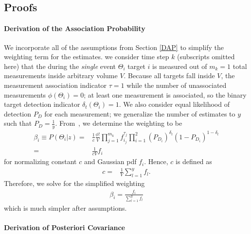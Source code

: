 \documentclass[letterpaper, 10pt, conference]{ieeeconf}
\begin{document}
\begin{appendix}
\label{append}

\subsection{Proofs}

\paragraph{Derivation of the Association Probability}

We incorporate all of the assumptions from Section \ref{DAP} to simplify the weighting term for the estimates.
 we consider time step $k$ (subscripts omitted here) that the during the \emph{single} event $\Theta_i$ target $i$ is measured out of $m_k=1$ total measurements inside arbitrary volume $V$.
Because all targets fall inside $V$, the measurement association indicator $\tau=1$ while the number of unassociated measurements $\phi(\Theta_i)=0$; at least one measurement is associated, so the binary target detection indicator $\delta_t(\Theta_i)=1$.
We also consider equal likelihood of detection $P_D$ for each measurement; we generalize the number of estimates to $y$ such that $P_D=\frac{1}{y}$.
From~\cite[Section ?.?]{TrackDataAssoc}, we determine the weighting to be
\begin{align}
\beta_i\equiv P(\Theta_i|z)=&\frac{1}{c}\frac{\phi!}{V}\displaystyle\prod_{j=1}^{m_k} f_{i_j}^{\tau_j}\displaystyle\prod_{i=1}^{2} (P_{D_i})^{\delta_t}(1-P_{D_i})^{1-\delta_t}\\
=&\frac{1}{cV}f_{i}
\end{align}
for normalizing constant $c$ and Gaussian pdf $f_{i}$. Hence, $c$ is defined as
\begin{align}
c=&\frac{1}{V}\displaystyle\sum\limits_{l=1}^y f_{l}.
\end{align}
Therefore, we solve for the simplified weighting
\begin{align}
\beta_i=\frac{f_i}{\displaystyle\sum\limits_{l=1}^y f_{l}}
\end{align}
which is much simpler after assumptions.

\paragraph{Derivation of Posteriori Covariance}


\end{appendix}
\end{document}
